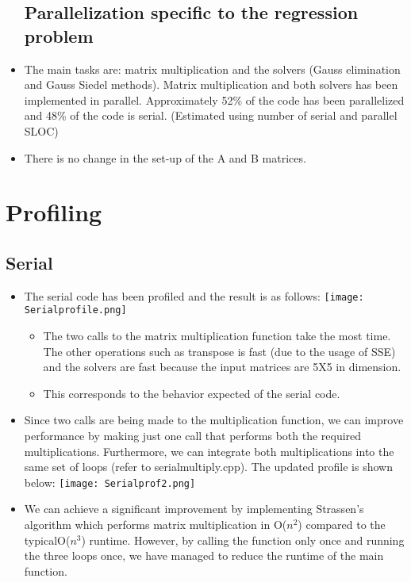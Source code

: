 \documentclass{article}
\begin{document}
\begin{spacing}{1.1}
\begin{itemize}
    \subsection{Parallelization specific to the regression problem}
    \item The main tasks are: matrix multiplication and the solvers (Gauss elimination and Gauss Siedel methods). Matrix multiplication and both solvers has been implemented in parallel. Approximately 52\% of the code has been parallelized and 48\% of the code is serial. (Estimated using number of serial and parallel SLOC)
    \item There is no change in the set-up of the A and B matrices.

\end{itemize}

\section{Profiling}

\subsection{Serial}

\begin{itemize}
\item The serial code has been profiled and the result is as follows: \newline \newline
\texttt{[image: Serialprofile.png]}
\begin{itemize}
\item The two calls to the matrix multiplication function take the most time. The other operations such as transpose is fast (due to the usage of SSE) and the solvers are fast because the input matrices are 5X5 in dimension.
\item This corresponds to the behavior expected of the serial code.
\end{itemize}
\item Since two calls are being made to the multiplication function, we can improve performance by making just one call that performs both the required multiplications. Furthermore, we can integrate both multiplications into the same set of loops (refer to serialmultiply.cpp). \newline The updated profile is shown below: \newline \newline
\texttt{[image: Serialprof2.png]}
\item We can achieve a significant improvement by implementing Strassen's algorithm which performs matrix multiplication in O($n^2$) compared to the typicalO($n^3$) runtime. However, by calling the function only once and running the three loops once, we have managed to reduce the runtime of the main function.
\end{itemize}


\end{spacing}
\end{document}
